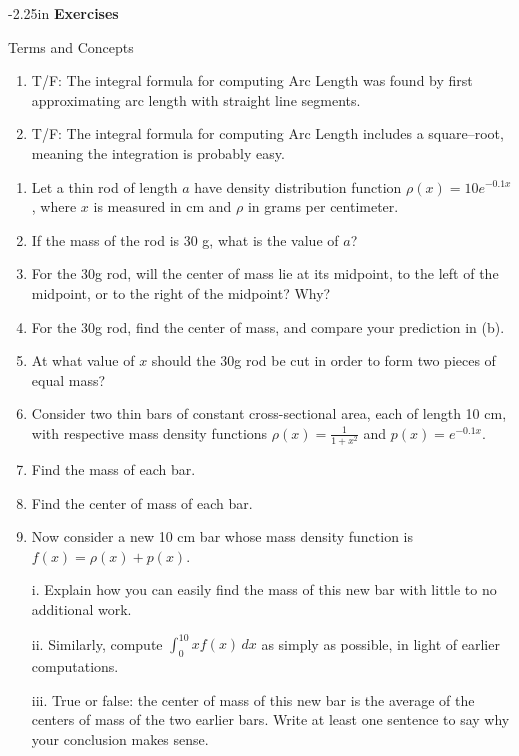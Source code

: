 \begin{adjustwidth*}{}{-2.25in}
\textbf{{\large Exercises}}
\setlength{\columnsep}{25pt}
\begin{multicols*}{2}
\noindent Terms and Concepts \small
\begin{enumerate}[1)]
\item T/F: The integral formula for computing Arc Length was found by first approximating arc length with straight line segments.
\item T/F: The integral formula for computing Arc Length includes a square--root, meaning the integration is probably easy.
\end{enumerate} 

 \small

\begin{enumerate}[1),resume]
  \item Let a thin rod of length $a$ have density distribution function $\rho(x) = 10e^{-0.1x}$, where $x$ is measured in cm and $\rho$ in grams per centimeter.
  \ba
  	\item If the mass of the rod is 30 g, what is the value of $a$?
	\item For the 30g rod, will the center of mass lie at its midpoint, to the left of the midpoint, or to the right of the midpoint?  Why?
	\item For the 30g rod, find the center of mass, and compare your prediction in (b).
	\item At what value of $x$ should the 30g rod be cut in order to form two pieces of equal mass? 
  \ea
  
  \item Consider two thin bars of constant cross-sectional area, each of length 10 cm, with respective mass density functions $\rho(x) = \frac{1}{1+x^2}$ and $p(x) = e^{-0.1x}$.
  \ba
  	\item Find the mass of each bar.
	\item Find the center of mass of each bar.
	\item Now consider a new 10 cm bar whose mass density function is $f(x) = \rho(x) + p(x)$.  
	\be
		\item[i.]  Explain how you can easily find the mass of this new bar with little to no additional work.
		\item[ii.]  Similarly, compute $\int_0^{10} xf(x) \, dx$ as simply as possible, in light of earlier computations.
		\item[iii.]  True or false:  the center of mass of this new bar is the average of the centers of mass of the two earlier bars.  Write at least one sentence to say why your conclusion makes sense.
	\ee
  \ea
  

\end{enumerate}
\end{multicols*}
\end{adjustwidth*}
